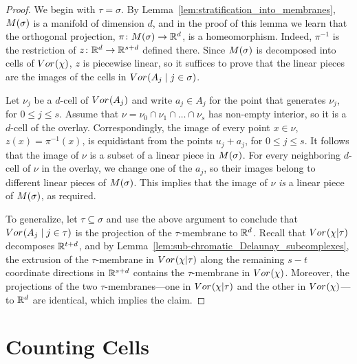 \documentclass[a4paper]{article}
\newcommand {\mm}[1]   {\ifmmode{#1}\else{\mbox{\(#1\)}}\fi}
\newcommand{\Rspace}        {\mm{{\mathbb R}}}
\newcommand{\Voronoi}[2]    {\mm{{\rm Vor}_{#1}{({#2})}}}
\newcommand{\Overlay}[3]    {\mm{{\rm Vor}_{#1}{({#2}\mid{#3})}}}
\newcommand{\Membrane}[1]   {\mm{M{({#1})}}}
\theoremstyle{definition}
\numberwithin{theorem}{section}
\numberwithin{equation}{section}
\begin{document}
\begin{proof}
  We begin with $\tau = \sigma$.
  By Lemma~\ref{lem:stratification_into_membranes}, $\Membrane{\sigma}$ is a manifold of dimension $d$, and in the proof of this lemma we learn that the orthogonal projection, $\pi \colon \Membrane{\sigma} \to \Rspace^d$, is a homeomorphism.
  Indeed, $\pi^{-1}$ is the restriction of $z \colon \Rspace^d \to \Rspace^{s+d}$ defined there.
  Since $\Membrane{\sigma}$ is decomposed into cells of $\Voronoi{}{\chi}$, $z$ is piecewise linear, so it suffices to prove that the linear pieces are the images of the cells in $\Overlay{}{A_j}{j \in \sigma}$.
  
  Let $\nu_j$ be a $d$-cell of $\Voronoi{}{A_j}$ and write $a_j \in A_j$ for the point that generates $\nu_j$, for $0 \leq j \leq s$.
  Assume that $\nu = \nu_0 \cap \nu_1 \cap \ldots \cap \nu_s$ has non-empty interior, so it is a $d$-cell of the overlay.
  Correspondingly, the image of every point $x \in \nu$, $z(x) = \pi^{-1}(x)$, is equidistant from the points $u_j + a_j$, for $0 \leq j \leq s$.
  It follows that the image of $\nu$ is a subset of a linear piece in $\Membrane{\sigma}$.
  For every neighboring $d$-cell of $\nu$ in the overlay, we change one of the $a_j$, so their images belong to different linear pieces of $\Membrane{\sigma}$.
  This implies that the image of $\nu$ \emph{is} a linear piece of $\Membrane{\sigma}$, as required.

  \medskip
  To generalize, let $\tau \subseteq \sigma$ and use the above argument  to conclude that $\Overlay{}{A_j}{j \in \tau}$ is the projection of the $\tau$-membrane to $\Rspace^d$.
  Recall that $\Voronoi{}{\chi | \tau}$ decomposes $\Rspace^{t+d}$, and by Lemma~\ref{lem:sub-chromatic_Delaunay_subcomplexes}, the extrusion of the $\tau$-membrane in $\Voronoi{}{\chi | \tau}$ along the remaining $s-t$ coordinate directions in $\Rspace^{s+d}$ contains the $\tau$-membrane in $\Voronoi{}{\chi}$.
  Moreover, the projections of the two $\tau$-membranes---one in $\Voronoi{}{\chi | \tau}$ and the other in $\Voronoi{}{\chi}$---to $\Rspace^d$ are identical, which implies the claim.
\end{proof}


\section{Counting Cells}
\label{sec:4}
\end{document}
